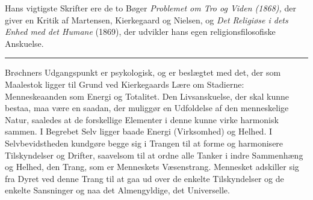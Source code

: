 \documentclass[12pt,a4paper,openany]{book}
\newcommand{\opage}[1]{\marginnote{\footnotesize\textit{[#1]}}}
\begin{document}
Hans vigtigste Skrifter ere de to Bøger \textit{Problemet om Tro og Viden
(1868),} der giver en Kritik af Martensen, Kierkegaard og Nielsen, og
\textit{Det Religiøse i dets Enhed med det Humane} (1869), der udvikler hans
egen religionsfilosofiske Anskuelse.

\begin{center}\rule{2cm}{0.4pt}\end{center}

Brøchners Udgangspunkt er psykologisk, og er beslægtet med det, der som
Maalestok ligger til Grund ved Kierkegaards Lære om Stadierne: Menneskeaanden
som Energi og Totalitet. Den Livsanskuelse, der skal kunne bestaa, maa være en
saadan, der muliggør en Udfoldelse af den menneskelige Natur, saaledes at de
forskellige Elementer i denne
\setcounter{footnote}{0}%
\opage{200}kunne virke harmonisk sammen. I Begrebet Selv ligger baade Energi
(Virksomhed) og Helhed. I Selvbevidstheden kundgøre begge sig i Trangen til at
forme og harmonisere Tilskyndelser og Drifter, saavelsom til at ordne alle
Tanker i indre Sammenhæng og Helhed, den Trang, som er Menneskets Væsenstrang.
Mennesket adskiller sig fra Dyret ved denne Trang til at gaa ud over de enkelte
Tilskyndelser og de enkelte Sansninger og naa det Almengyldige, det Universelle.
\end{document}

